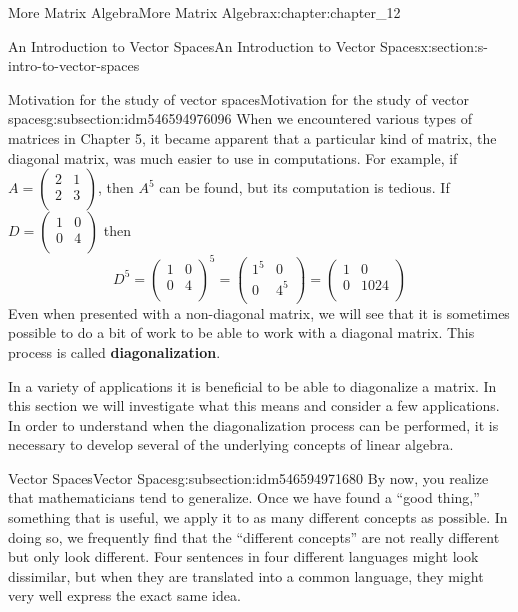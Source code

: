 \documentclass[oneside,10pt,]{book}
\newcommand{\terminology}[1]{\textbf{#1}}
\numberwithin{equation}{section}
\begin{document}
\begin{chapterptx}{More Matrix Algebra}{}{More Matrix Algebra}{}{}{x:chapter:chapter_12}
\begin{sectionptx}{An Introduction to Vector Spaces}{}{An Introduction to Vector Spaces}{}{}{x:section:s-intro-to-vector-spaces}
\begin{subsectionptx}{Motivation for the study of vector spaces}{}{Motivation for the study of vector spaces}{}{}{g:subsection:idm546594976096}
When we encountered various types of matrices in Chapter 5, it became apparent that a particular kind of matrix, the diagonal matrix, was much easier to use in computations. For example, if \(A =\left(
\begin{array}{cc}
2 & 1 \\
2 & 3 \\
\end{array}
\right)\), then \(A^5\) can be found, but its computation is tedious.  If \(D =\left(
\begin{array}{cc}
1 & 0 \\
0 & 4 \\
\end{array}
\right)\) then%
\begin{equation*}
D^5 =\left(
\begin{array}{cc}
1 & 0 \\
0 & 4 \\
\end{array}
\right)^5= \left(
\begin{array}{cc}
1^5 & 0 \\
0 & 4^5 \\
\end{array}
\right)= \left(
\begin{array}{cc}
1 & 0 \\
0 & 1024 \\
\end{array}
\right)
\end{equation*}
Even when presented with a non-diagonal matrix, we will see that it is sometimes possible to do a bit of work to be able to work with a diagonal matrix.  This process is called \terminology{diagonalization}.%
\par
In a variety of applications it is beneficial to be able to diagonalize a matrix. In this section we will investigate what this means and consider a few applications. In order to understand when the diagonalization process can be performed, it is necessary to develop several of the underlying concepts of linear algebra.%
\end{subsectionptx}
%
%
\typeout{************************************************}
\typeout{************************************************}
%
\begin{subsectionptx}{Vector Spaces}{}{Vector Spaces}{}{}{g:subsection:idm546594971680}
By now, you realize that mathematicians tend to generalize. Once we have found a ``good thing,'' something that is useful, we apply it to as many different concepts as possible. In doing so, we frequently find that the ``different concepts'' are not really different but only look different. Four sentences in four different languages might look dissimilar, but when they are translated into a common language, they might very well express the exact same idea.%

\end{subsectionptx}
\end{sectionptx}
\end{chapterptx}
\end{document}
